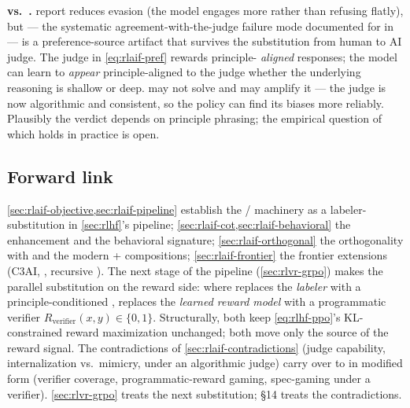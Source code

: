 \begin{contradiction}
\textbf{ vs.\ .} \citet{bai2022-cai} report  reduces
evasion (the model engages more rather than refusing flatly), but
 --- the systematic agreement-with-the-judge failure mode
documented for  in \citet{sharma2023-sycophancy} --- is a
preference-source artifact that survives the substitution from human
to AI judge. The judge in \cref{eq:rlaif-pref} rewards principle-
\emph{aligned} responses; the model can learn to \emph{appear}
principle-aligned to the judge whether the underlying reasoning is
shallow or deep.  may not solve  and may amplify it ---
the judge is now algorithmic and consistent, so the policy can find
its biases more reliably. Plausibly the verdict depends on principle
phrasing; the empirical question of which holds in practice is open.
\end{contradiction}

\subsection{Forward link}
\label{sec:rlaif-forward}

\cref{sec:rlaif-objective,sec:rlaif-pipeline} establish the
/ machinery as a labeler-substitution in
\cref{sec:rlhf}'s pipeline; \cref{sec:rlaif-cot,sec:rlaif-behavioral}
the  enhancement and the  behavioral
signature; \cref{sec:rlaif-orthogonal} the orthogonality with  and
the modern  +  compositions; \cref{sec:rlaif-frontier} the
frontier extensions (C3AI, , recursive ). The next stage of
the pipeline (\cref{sec:rlvr-grpo}) makes the parallel substitution on
the reward side: where  replaces the \emph{labeler} with a
principle-conditioned ,  replaces the \emph{learned reward
model} with a programmatic verifier
$R_{\mathrm{verifier}}(x, y) \in \{0, 1\}$. Structurally, both keep
\cref{eq:rlhf-ppo}'s KL-constrained reward maximization unchanged;
both move only the source of the reward signal. The contradictions of
\cref{sec:rlaif-contradictions} (judge capability, internalization
vs.\ mimicry,  under an algorithmic judge) carry over to
 in modified form (verifier coverage, programmatic-reward gaming,
spec-gaming under a verifier). \cref{sec:rlvr-grpo} treats the next
substitution; §14 treats the contradictions.
